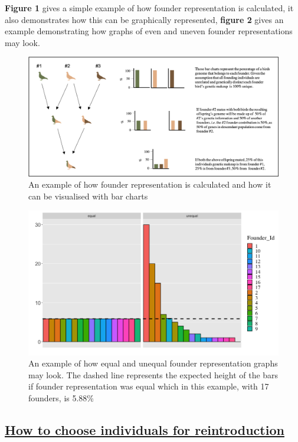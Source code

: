 \documentclass[12pt,]{article}
\begin{document}
\textbf{Figure 1} gives a simple example of how founder representation
is calculated, it also demonstrates how this can be graphically
represented, \textbf{figure 2} gives an example demonstrating how graphs
of even and uneven founder representations may look.

\begin{figure}[H]

\includegraphics[width=\linewidth]{../Images/figure1.png}
  \caption{An example of how founder representation is calculated and how it can be visualised with bar charts}
\end{figure}

\begin{figure}[H]

\includegraphics[width=0.7\linewidth, center]{../Images/figure2.png}
  \caption{An example of how equal and unequal founder representation graphs may look. The dashed line represents the expected height of the bars if founder representation was equal which in this example, with 17 founders, is 5.88\%}
\end{figure}

\subsection{\underline{\textbf{How to choose individuals for reintroduction}}}
\end{document}
